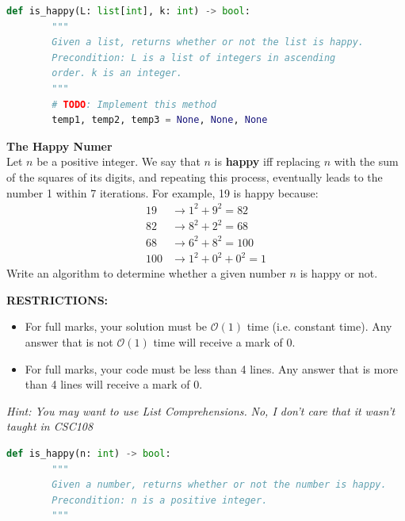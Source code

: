\documentclass[letterpaper,12pt,addpoints]{exam}
\begin{document}
\begin{questions}
    \begin{lstlisting}[language=Python, style=mystyle]
    def is_happy(L: list[int], k: int) -> bool:
        """
        Given a list, returns whether or not the list is happy.
        Precondition: L is a list of integers in ascending 
        order. k is an integer.
        """
        # TODO: Implement this method
        temp1, temp2, temp3 = None, None, None
    \end{lstlisting}

    \clearpage
    \question[10] \textbf{The Happy Numer} \\
    Let $n$ be a positive integer. We say that $n$ is \textbf{happy} iff replacing $n$ with the sum of the squares of its digits, and repeating this process, eventually leads to the number 1 within 7 iterations. For example, 19 is happy because:
    \begin{align*}
        19 &\rightarrow 1^2 + 9^2 = 82 \\
        82 &\rightarrow 8^2 + 2^2 = 68 \\
        68 &\rightarrow 6^2 + 8^2 = 100 \\
        100 &\rightarrow 1^2 + 0^2 + 0^2 = 1
    \end{align*}
    Write an algorithm to determine whether a given number $n$ is happy or not.

    \begin{center}
        \textbf{RESTRICTIONS:}
        \begin{itemize}
            \item For full marks, your solution must be $\mathcal{O}(1)$ time (i.e. constant time). Any answer that is not $\mathcal{O}(1)$ time will receive a mark of 0.
            \item For full marks, your code must be less than 4 lines. Any answer that is more than 4 lines will receive a mark of 0.
        \end{itemize}
        \textit{Hint: You may want to use List Comprehensions.}
        \textit{No, I don't care that it wasn't taught in CSC108}
    \end{center}
    \begin{lstlisting}[language=Python, style=mystyle]
    def is_happy(n: int) -> bool:
        """
        Given a number, returns whether or not the number is happy.
        Precondition: n is a positive integer.
        """
    \end{lstlisting}


\end{questions}
\end{document}
